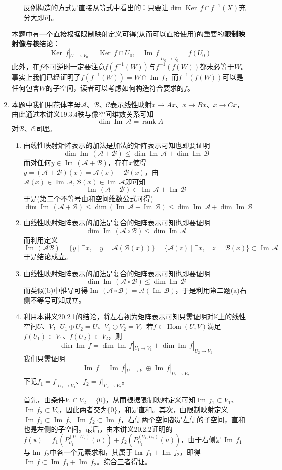 \documentclass[a4paper,UTF8,fontset=windows,AutoFakeBold]{ctexart}
\DeclareMathOperator{\rank}{rank}
\DeclareMathOperator{\im}{Im\,}
\DeclareMathOperator{\Ker}{Ker\,}
\DeclareMathOperator{\Hom}{Hom}
\newcommand*{\ma}{\mathcal{A}}
\newcommand*{\mb}{\mathcal{B}}
\newcommand*{\mc}{\mathcal{C}}
\newcommand*{\note}{\noindent *}
\begin{document}
\begin{enumerate}
\begin{enumerate}
        \note 反例构造的方式是直接从等式中看出的：只要让$\dim\Ker f\cap f^{-1}(X)$充分大即可。
    \end{enumerate}

    \note 本题中有一个直接根据限制映射定义可得(从而可以直接使用)的重要的\textbf{限制映射像与核}结论：
    $$\Ker f|_{U_0\to V_0}=\Ker f\cap U_0,\quad\im f|_{U_0\to V_0}=f(U_0)$$
    此外，在$f$不可逆时一定要注意$f(f^{-1}(W))$与$f^{-1}(f(W))$都未必等于$W$。事实上我们已经证明了$f(f^{-1}(W))=W\cap\im f$，而$f^{-1}(f(W))$可以是任何包含$W$的子空间，读者可以考虑如何构造符合要求的$f$。

    \item
    本题中我们用花体字母$\ma$、$\mb$、$\mc$表示线性映射$x\to Ax$、$x\to Bx$、$x\to Cx$，由此通过本讲义19.3.4秩与像空间维数关系可知
    $$\dim\im\ma=\rank A$$
    对$\mb$、$\mc$同理。
    \begin{enumerate}
        \item 由线性映射矩阵表示的加法是加法的矩阵表示可知也即要证明
        $$\dim\im(\ma+\mb)\le\dim\im\ma+\dim\im\mb$$
        而对任何$y\in\im(\ma+\mb)$，存在$x$使得$y=(\ma+\mb)(x)=\ma(x)+\mb(x)$，由$\ma(x)\in\im\ma,\mb(x)\in\im\ma$即可知
        $$\im(\ma+\mb)\subset\im\ma+\im\mb$$
        于是(第二个不等号由和空间维数公式可得)
        $$\dim\im(\ma+\mb)\le\dim(\im\ma+\im\mb)\le\dim\im\ma+\dim\im\mb$$

        \item 由线性映射矩阵表示的加法是复合的矩阵表示可知也即要证明
        $$\dim\im(\ma\circ\mb)\le\dim\im\ma$$
        而利用定义
        $$\im(\ma\mb)=\{y\mid\exists x,\quad y=\ma(\mb(x))\}=\{\ma(z)\mid \exists x,\quad z=\mb(x)\}\subset\im\ma$$
        于是结论成立。

        \item 由线性映射矩阵表示的加法是复合的矩阵表示可知也即要证明
        $$\dim\im(\ma\circ\mb)\le\dim\im\mb$$
        而类似(b)中推导可得$\im(\ma\circ \mb)=\ma(\im\mb)$，于是利用第二题(a)右侧不等号可知成立。

        \item 利用本讲义20.2.1的结论，将左右视为矩阵表示可知只需证明对$\mathbb{K}$上的线性空间$U$、$V$，$U_1\oplus U_2=U$、$V_1\oplus V_2=V$，若$f\in\Hom(U,V)$满足$f(U_1)\subset V_1$、$f(U_2)\subset V_2$，则
        $$\dim\im f=\dim\im f|_{U_1\to V_1}+\dim\im f|_{U_2\to V_2}$$
        我们只需证明
        $$\im f=\im f|_{U_1\to V_1}\oplus\im f|_{U_2\to V_2}$$
        下记$f_1=f|_{U_1\to V_1}$、$f_2=f|_{U_2\to V_2}$。
        
        首先，由条件$V_1\cap V_2=\{0\}$，从而根据限制映射定义可知$\im f_1\subset V_1$、$\im f_2\subset V_2$，因此两者交为$\{0\}$，和是直和。其次，由限制映射定义$\im f_1\subset\im f$、$\im f_2\subset\im f$，右侧两个空间都是左侧的子空间，直和也是左侧的子空间。最后，由本讲义20.2.2证明的$f(u)=f_1(P_{U_1}^{(U_1,U_2)}(u))+f_2(P_{U_2}^{(U_1,U_2)}(u))$，由于右侧是$\im f_1$与$\im f_2$中各一个元素求和，其属于$\im f_1+\im f_2$，即得$\im f\subset \im f_1+\im f_2$。综合三者得证。


\end{enumerate}
\end{enumerate}
\end{document}
